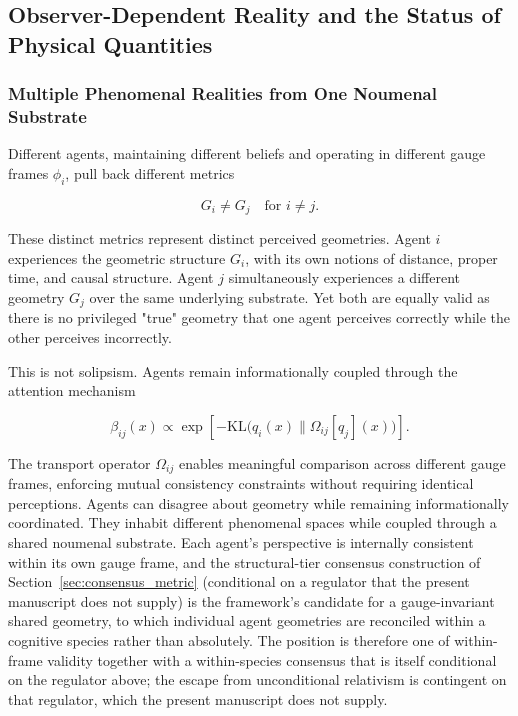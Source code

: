 \documentclass[11pt]{article}
\begin{document}
\subsection{Observer-Dependent Reality and the Status of Physical Quantities}
\label{sec:observer}

\subsubsection{Multiple Phenomenal Realities from One Noumenal Substrate}

Different agents, maintaining different beliefs and operating in different gauge frames $\phi_i$, pull back different metrics

\begin{equation}
G_i \neq G_j \quad \text{for } i \neq j.
\end{equation}

These distinct metrics represent distinct perceived geometries. Agent $i$ experiences the geometric structure $G_i$, with its own notions of distance, proper time, and causal structure. Agent $j$ simultaneously experiences a different geometry $G_j$ over the same underlying substrate. Yet both are equally valid as there is no privileged "true" geometry that one agent perceives correctly while the other perceives incorrectly.

This is not solipsism. Agents remain informationally coupled through the attention mechanism

\begin{equation}
\beta_{ij}(x) \propto \exp\left[-\mathrm{KL}\big(q_i(x) \| \Omega_{ij}[q_j](x)\big)\right].
\end{equation}

The transport operator $\Omega_{ij}$ enables meaningful comparison across different gauge frames, enforcing mutual consistency constraints without requiring identical perceptions. Agents can disagree about geometry while remaining informationally coordinated.  They inhabit different phenomenal spaces while coupled through a shared noumenal substrate. Each agent's perspective is internally consistent within its own gauge frame, and the structural-tier consensus construction of Section~\ref{sec:consensus_metric} (conditional on a regulator that the present manuscript does not supply) is the framework's candidate for a gauge-invariant shared geometry, to which individual agent geometries are reconciled within a cognitive species rather than absolutely. The position is therefore one of within-frame validity together with a within-species consensus that is itself conditional on the regulator above; the escape from unconditional relativism is contingent on that regulator, which the present manuscript does not supply.
\end{document}

